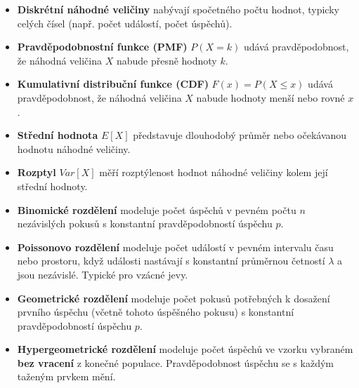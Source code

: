 \documentclass[
  czech,
  11pt,
  letterpaper,
  DIV=11,
  numbers=noendperiod]{scrreprt}
\providecommand{\tightlist}{%
  \setlength{\itemsep}{0pt}\setlength{\parskip}{0pt}}
\begin{document}
\begin{itemize}
\tightlist
\item
  \textbf{Diskrétní náhodné veličiny} nabývají spočetného počtu hodnot,
  typicky celých čísel (např. počet událostí, počet úspěchů).
\item
  \textbf{Pravděpodobnostní funkce (PMF)} \(P(X=k)\) udává
  pravděpodobnost, že náhodná veličina \(X\) nabude přesně hodnoty
  \(k\).
\item
  \textbf{Kumulativní distribuční funkce (CDF)} \(F(x)=P(X \le x)\)
  udává pravděpodobnost, že náhodná veličina \(X\) nabude hodnoty menší
  nebo rovné \(x\).
\item
  \textbf{Střední hodnota} \(E[X]\) představuje dlouhodobý průměr nebo
  očekávanou hodnotu náhodné veličiny.
\item
  \textbf{Rozptyl} \(Var[X]\) měří rozptýlenost hodnot náhodné veličiny
  kolem její střední hodnoty.
\item
  \textbf{Binomické rozdělení} modeluje počet úspěchů v pevném počtu
  \(n\) nezávislých pokusů s konstantní pravděpodobností úspěchu \(p\).
\item
  \textbf{Poissonovo rozdělení} modeluje počet událostí v pevném
  intervalu času nebo prostoru, když události nastávají s konstantní
  průměrnou četností \(\lambda\) a jsou nezávislé. Typické pro vzácné
  jevy.
\item
  \textbf{Geometrické rozdělení} modeluje počet pokusů potřebných k
  dosažení prvního úspěchu (včetně tohoto úspěšného pokusu) s konstantní
  pravděpodobností úspěchu \(p\).
\item
  \textbf{Hypergeometrické rozdělení} modeluje počet úspěchů ve vzorku
  vybraném \textbf{bez vracení} z konečné populace. Pravděpodobnost
  úspěchu se s každým taženým prvkem mění.
\end{itemize}
\end{document}
